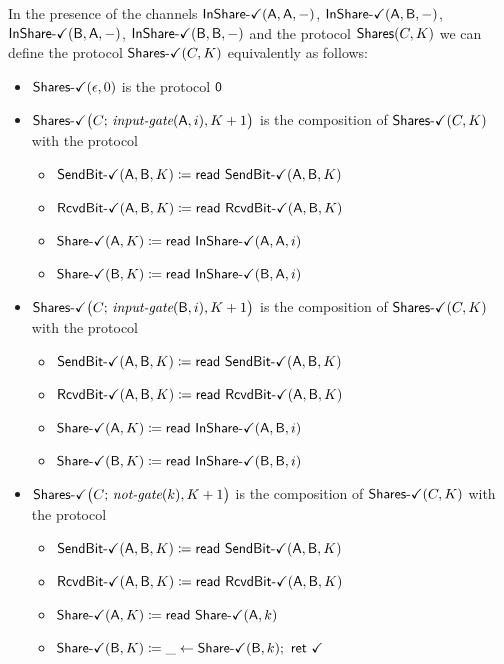 \noindent In the presence of the channels $\InShareOk(\A,\A,-)$, $\InShareOk(\A,\B,-)$, $\InShareOk(\B,\A,-)$, $\InShareOk(\B,\B,-)$ and the protocol $\Shares(C,K)$ we can define the protocol $\SharesOk(C,K)$ equivalently as follows:

\begin{itemize}
\item $\SharesOk(\epsilon,0)$ is the protocol $\zero$

\item $\SharesOk\big(C; \, \inputgate(\A,i),K+1\big)$ is the composition of $\SharesOk(C,K)$ with the protocol
\begin{itemize}
\item {\color{teal} $\SendBitOk(\A,\B,K) \coloneqq \read{\SendBitOk(\A,\B,K)}$}
\item {\color{teal} $\RcvdBitOk(\A,\B,K) \coloneqq \read{\RcvdBitOk(\A,\B,K)}$}
\item {\color{teal} $\ShareOk(\A,K) \coloneqq \read{\InShareOk(\A,\A,i)}$}
\item {\color{teal} $\ShareOk(\B,K) \coloneqq \read{\InShareOk(\B,\A,i)}$}
\end{itemize}

\item $\SharesOk\big(C; \, \inputgate(\B,i),K+1\big)$ is the composition of $\SharesOk(C,K)$ with the protocol
\begin{itemize}
\item {\color{teal} $\SendBitOk(\A,\B,K) \coloneqq \read{\SendBitOk(\A,\B,K)}$}
\item {\color{teal} $\RcvdBitOk(\A,\B,K) \coloneqq \read{\RcvdBitOk(\A,\B,K)}$}
\item {\color{teal} $\ShareOk(\A,K) \coloneqq \read{\InShareOk(\A,\B,i)}$}
\item {\color{teal} $\ShareOk(\B,K) \coloneqq \read{\InShareOk(\B,\B,i)}$}
\end{itemize}

\item $\SharesOk\big(C; \, \notgate(k),K+1\big)$ is the composition of $\SharesOk(C,K)$ with the protocol
\begin{itemize}
\item {\color{teal} $\SendBitOk(\A,\B,K) \coloneqq \read{\SendBitOk(\A,\B,K)}$}
\item {\color{teal} $\RcvdBitOk(\A,\B,K) \coloneqq \read{\RcvdBitOk(\A,\B,K)}$}
\item {\color{teal} $\ShareOk(\A,K) \coloneqq \read{\ShareOk(\A,k)}$}
\item {\color{teal} $\ShareOk(\B,K) \coloneqq \_ \leftarrow \ShareOk(\B,k); \ \ret{\checkmark}$}
\end{itemize}


\end{itemize}
